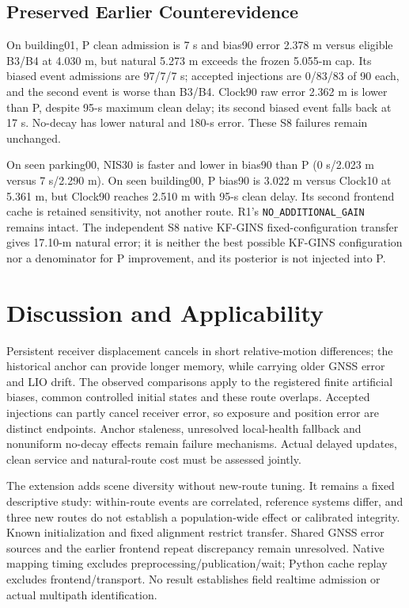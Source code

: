 \documentclass[conference]{IEEEtran}
\begin{document}
\subsection{Preserved Earlier Counterevidence}
On building01, P clean admission is 7 s and bias90 error 2.378 m versus eligible B3/B4 at 4.030 m, but natural 5.273 m exceeds the frozen 5.055-m cap. Its biased event admissions are 97/7/7 s; accepted injections are 0/83/83 of 90 each, and the second event is worse than B3/B4. Clock90 raw error 2.362 m is lower than P, despite 95-s maximum clean delay; its second biased event falls back at 17 s. No-decay has lower natural and 180-s error. These S8 failures remain unchanged.

On seen parking00, NIS30 is faster and lower in bias90 than P (0 s/2.023 m versus 7 s/2.290 m). On seen building00, P bias90 is 3.022 m versus Clock10 at 5.361 m, but Clock90 reaches 2.510 m with 95-s clean delay. Its second frontend cache is retained sensitivity, not another route. R1's \texttt{NO\_ADDITIONAL\_GAIN} remains intact. The independent S8 native KF-GINS fixed-configuration transfer gives 17.10-m natural error; it is neither the best possible KF-GINS configuration nor a denominator for P improvement, and its posterior is not injected into P.

\section{Discussion and Applicability}
Persistent receiver displacement cancels in short relative-motion differences; the historical anchor can provide longer memory, while carrying older GNSS error and LIO drift. The observed comparisons apply to the registered finite artificial biases, common controlled initial states and these route overlaps. Accepted injections can partly cancel receiver error, so exposure and position error are distinct endpoints. Anchor staleness, unresolved local-health fallback and nonuniform no-decay effects remain failure mechanisms. Actual delayed updates, clean service and natural-route cost must be assessed jointly.

The extension adds scene diversity without new-route tuning. It remains a fixed descriptive study: within-route events are correlated, reference systems differ, and three new routes do not establish a population-wide effect or calibrated integrity. Known initialization and fixed alignment restrict transfer. Shared GNSS error sources and the earlier frontend repeat discrepancy remain unresolved. Native mapping timing excludes preprocessing/publication/wait; Python cache replay excludes frontend/transport. No result establishes field realtime admission or actual multipath identification.
\end{document}
